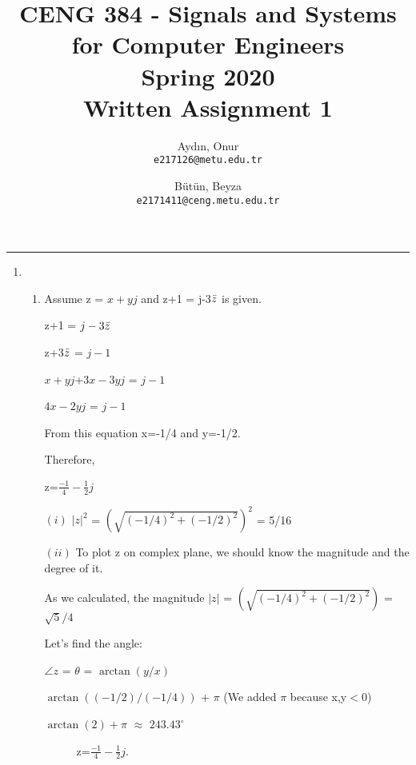 \documentclass[10pt,a4paper, margin=1in]{article}
\author{
  Aydın, Onur\\
  \texttt{e217126@metu.edu.tr}
  \and
  Bütün, Beyza\\
  \texttt{e2171411@ceng.metu.edu.tr}
}
\title{CENG 384 - Signals and Systems for Computer Engineers \\
Spring 2020 \\
Written Assignment 1}
\begin{document}
\maketitle

\noindent\rule{19cm}{1.2pt}

\begin{enumerate}

\item 
    \begin{enumerate}
    \item %
    Assume z = $x+yj$ and z+1 = j-3$\Bar{z}$ is given. 
    
    z+1 = $j-3 \Bar{z}$
    
    z+3$\Bar{z}$ = $j-1$
    
    $x+yj$+$3x-3yj$ = $j-1$
    
    $4x-2yj$ = $j-1$
    
    
    From this equation x=-1/4 and y=-1/2.
    \vspace{0.25cm}
    
    Therefore,
    
    z=$\frac{-1}{4}-\frac{1}{2}j$
    \vspace{0.5cm}
    
    $(i)$ ${\vert z \vert}^2$ = $(\sqrt{(-1/4)^2 + (-1/2)^2 })^2$ = 5/16
    \vspace{0.5cm}
    
    $(ii)$
    To plot z on complex plane, we should know the magnitude and the degree of it.
    
    As we calculated, the magnitude ${\vert z \vert}$ = $(\sqrt{(-1/4)^2 + (-1/2)^2 })$ = $\sqrt{5}/4$
    \vspace{0.25cm}
    
    Let's find the angle:
    
    $\angle z$ = $\theta$ = $\arctan(y/x)$
    
    $\arctan((-1/2)/(-1/4))$ + $\pi$  (We added $\pi$ because x,y$<$0)
    
    $\arctan(2) + \pi$ $\approx$ $243.43^{\circ}$
    
    \begin{figure}[h!]
    \centering
        \caption{ z=$\frac{-1}{4}-\frac{1}{2}j$.}
        \label{fig:q1}
    \end{figure}
    

\end{enumerate}
\end{enumerate}
\end{document}
